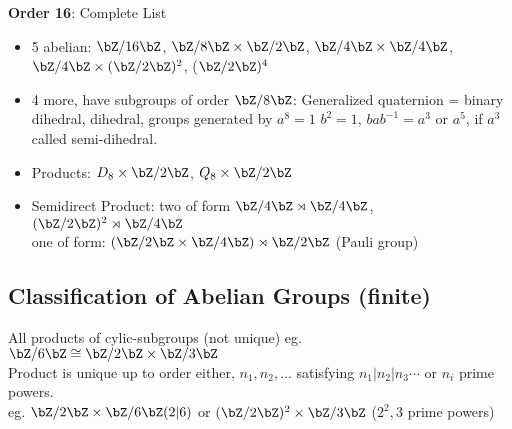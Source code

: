 \noindent
\textbf{Order 16}: Complete List 
\begin{itemize}
    \item 5 abelian: $\bZ/16\bZ$, $\bZ/8\bZ \times \bZ/2\bZ$, $\bZ/4\bZ \times \bZ/4\bZ$, $\bZ/4\bZ \times (\bZ/2\bZ)^2$, ($\bZ/2\bZ)^4$ 
    \item 4 more, have subgroups of order $\bZ/8\bZ$: Generalized quaternion = binary dihedral, dihedral, groups generated by $a^8=1$ $b^2=1$, $bab^{-1} = a^3$ or $a^5$, if $a^3$ called semi-dihedral. 
    \item Products: $D_8 \times \bZ/2\bZ$, $Q_8 \times \bZ/2\bZ$ 
    \item Semidirect Product: two of form $\bZ/4\bZ \rtimes \bZ/4\bZ$, $(\bZ/2\bZ)^2 \rtimes \bZ/4\bZ$ \\
    one of form: $(\bZ/2\bZ \times \bZ/4\bZ) \rtimes \bZ/2\bZ$ (Pauli group) 
\end{itemize}

\subsection{Classification of Abelian Groups (finite)} 

All products of cylic-subgroups (not unique) eg. $\bZ/6\bZ \cong \bZ/2\bZ \times \bZ/3\bZ$ \\
Product is unique up to order either, $n_1, n_2, \ldots$ satisfying $n_1 | n_2 | n_3 \cdots$ or $n_i$ prime powers. \\
eg. $\bZ/2\bZ \times \bZ/6\bZ (2 | 6)$ or $(\bZ/2\bZ)^2 \times \bZ/3\bZ$ ($2^2, 3$ prime powers) 

